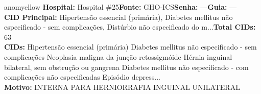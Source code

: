 \documentclass[a4paper,10pt]{article}
\begin{document}
\begin{anomalycard}[Interna\c{c}\~{a}o \#435 | Pac. \#508 | MODERADO (z=2.17) | LOS: 1d | 05/03/2026\,$\to$\,06/03/2026]{anomyellow}
\textbf{Hospital:} Hospital \#25\quad \textbf{Fonte:} GHO-ICS\quad \textbf{Senha:} ---\quad \textbf{Guia:} ---\\

\textbf{CID Principal:} {\small Hipertensão essencial (primária), Diabetes mellitus não especificado - sem complicações, Distúrbio não especificado do m...}\quad\textbf{Total CIDs:} 63\\

\textbf{CIDs:} {\scriptsize Hipertensão essencial (primária) \textbar{} Diabetes mellitus não especificado - sem complicações \textbar{} Neoplasia maligna da junção retossigmóide \textbar{} Hérnia inguinal bilateral, sem obstrução ou gangrena \textbar{} Diabetes mellitus não especificado - com complicações não especificadas \textbar{} Episódio depress...}\\

\textbf{Motivo:} {\scriptsize INTERNA PARA HERNIORRAFIA INGUINAL UNILATERAL}\\

\end{anomalycard}
\end{document}
